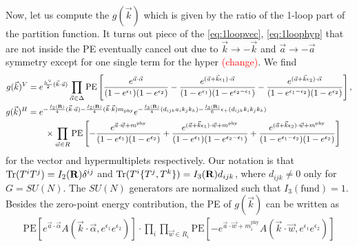 \documentclass[letterpaper, 11pt]{article}
\newcommand{\nn}{\nonumber}
\def\a{\alpha}
\def\e{\epsilon}
\def\Tr{{\rm Tr}}
\begin{document}
Now, let us compute the $g(\vec{k})$ which is given by the ratio of the 1-loop part of the partition function. 
It turns out piece of the \eqref{eq:1loopvec}, \eqref{eq:1loophyp} that are not inside the PE eventually cancel out due to $\vec{k} \to -\vec{k}$ and $\vec{a} \to -\vec{a}$ symmetry except for one single term for the hyper \textcolor{red}{(change)}.  We find
\begin{align}
 g(\vec{k})^{V} &= e^{\frac{h^\vee}{2}(\vec{k}\cdot \vec{a})}\prod_{\vec{\a} \in \Delta}  \textrm{PE} \left[  \frac{e^{\vec{a} \cdot \vec{\a}}}{(1-e^{\e_1})(1-e^{\e_2})} - \frac{e^{(\vec{a}+\vec{k}\e_1) \cdot \vec{\a}}}{(1-e^{\e_1})(1-e^{\e_2-\e_1})}- \frac{e^{(\vec{a}+\vec{k}\e_2) \cdot \vec{\a}}}{(1-e^{\e_1- \e_2})(1-e^{\e_2})} \right] ,\nn \\
 g(\vec{k})^{H} &= e^{-\frac{I_2(\mathbf{R})}{4}(\vec{k}\cdot \vec{a})-\frac{I_2(\mathbf{R})}{4}(\vec{k}\cdot \vec{k})m_{\rm phy}} 
 e^{- \frac{I_3(\mathbf{R})}{4} (d_{ijk} a_i k_j k_k ) - \frac{ I_3(\mathbf{R})}{6} \epsilon_+(d_{ijk} k_i k_j k_k )}
 \nn\\&
 \quad\quad\times 
 \prod_{\vec{w} \in R}\textrm{PE} \left[ -\frac{ e^{\vec{a} \cdot \vec{w}+ m^{\textrm{phy}}}}{(1-e^{\e_1})(1-e^{\e_2})} + \frac{e^{(\vec{a}+\vec{k}\e_1) \cdot \vec{w} + m^{\textrm{phy}}}}{(1-e^{\e_1})(1-e^{\e_2-\e_1})} + \frac{e^{(\vec{a}+\vec{k}\e_2) \cdot \vec{w} + m^{\textrm{phy}}}}{(1-e^{\e_1- \e_2})(1-e^{\e_2})} \right]
\end{align}
for the vector and hypermultiplets respectively. Our notation is that $\Tr(T^i T^j) = I_2(\mathbf{R})\delta^{ij}$ and $\Tr(T^i \{T^j,T^k\}) = I_3(\mathbf{R})d_{ijk}$, where $d_{ijk} \neq 0$ only for $G = SU(N)$. The $SU(N)$ generators are normalized such that $I_3(\text{fund}) =1$.
Besides the zero-point energy contribution, the PE of $g(\vec{k})$ can be written as 
\begin{align}
\textrm{PE} \left[ e^{\vec{a} \cdot \vec{\a}}A(\vec{k} \cdot \vec{\a}, e^{\e_1} e^{\e_2})\right]\cdot 
 \prod_{i} \prod_{\vec{w} \in R_i} 
\textrm{PE} \left[- e^{\vec{a} \cdot \vec{w} + m^{\textrm{phy}}_i}A(\vec{k} \cdot \vec{w}, e^{\e_1} e^{\e_2})\right]
\end{align} 
\end{document}
